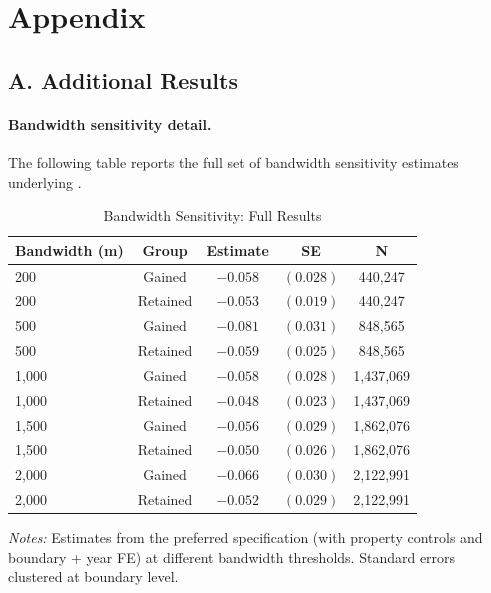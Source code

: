 \documentclass[12pt]{article}
\begin{document}
\clearpage
\appendix
\setcounter{table}{0}
\setcounter{figure}{0}
\renewcommand{\thetable}{A\arabic{table}}
\renewcommand{\thefigure}{A\arabic{figure}}

\section*{Appendix}

\subsection*{A. Additional Results}

\paragraph{Bandwidth sensitivity detail.} The following table reports the full set of bandwidth sensitivity estimates underlying .

\begin{table}[H]
\centering
\caption{Bandwidth Sensitivity: Full Results}
\label{tab:bw_detail}
\begin{tabular}{lcccc}
\toprule
Bandwidth (m) & Group & Estimate & SE & N \\
\midrule
200 & Gained & $-0.058$ & $(0.028)$ & 440,247 \\
200 & Retained & $-0.053$ & $(0.019)$ & 440,247 \\
500 & Gained & $-0.081$ & $(0.031)$ & 848,565 \\
500 & Retained & $-0.059$ & $(0.025)$ & 848,565 \\
1,000 & Gained & $-0.058$ & $(0.028)$ & 1,437,069 \\
1,000 & Retained & $-0.048$ & $(0.023)$ & 1,437,069 \\
1,500 & Gained & $-0.056$ & $(0.029)$ & 1,862,076 \\
1,500 & Retained & $-0.050$ & $(0.026)$ & 1,862,076 \\
2,000 & Gained & $-0.066$ & $(0.030)$ & 2,122,991 \\
2,000 & Retained & $-0.052$ & $(0.029)$ & 2,122,991 \\
\bottomrule
\end{tabular}
\begin{tablenotes}[flushleft]
\small
\item \textit{Notes:} Estimates from the preferred specification (with property controls and boundary + year FE) at different bandwidth thresholds. Standard errors clustered at boundary level.
\end{tablenotes}
\end{table}
\end{document}
